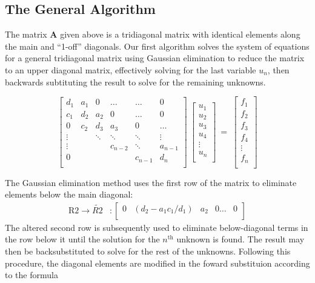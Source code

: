 \documentclass[10pt,showpacs,preprintnumbers,footinbib,amsmath,amssymb,aps,prl,twocolumn,groupedaddress,superscriptaddress,showkeys]{revtex4-1}
\begin{document}
\subsection*{The General Algorithm}

The matrix $\mathbf{A}$ given above is a tridiagonal matrix with identical elements along
the main and ``1-off'' diagonals. Our first algorithm solves the system of equations for a general
tridiagonal matrix using Gaussian elimination to reduce the matrix to an upper diagonal matrix,
effectively solving for the last variable $u_n$, then backwards subtituting the result to solve
for the remaining unknowns.

\[
\begin{bmatrix}
	d_1 & a_1 & 0 & \dots & \dots & 0 \\
	c_1 & d_2 & a_2 & 0 & \dots & 0 \\
	0 & c_2 & d_3 & a_3 & 0 & \dots \\
	\vdots & & \ddots & \ddots & \ddots & \vdots \\
	\vdots & & & c_{n-2} & \ddots & a_{n-1}\\
	0 & & & & c_{n-1} & d_n \\
\end{bmatrix}
~
\begin{bmatrix}
	u_1\\
	u_2\\
	u_3\\
	u_4\\
	\vdots\\
	u_n\\
\end{bmatrix}
~
=
~
\begin{bmatrix}
	f_1\\
	f_2\\
	f_3\\
	f_4\\
	\vdots\\
	f_n\\
\end{bmatrix}
\]

The Gaussian elimination method uses the first row of the matrix to
eliminate elements below the main diagonal:
\begin{align*}
	\mathrm{R2} \rightarrow \tilde{R2}&:
	\begin{bmatrix}
		0 & (d_2 - a_1 c_1/d_1) & a_2 & 0 \dots & 0\\
	\end{bmatrix}
\end{align*}
The altered second row is subsequently used to eliminate below-diagonal terms in the row
below it until the solution for the $n^{\mathrm{th}}$ unknown is found. The
result may then be backsubstituted to solve for the rest of the unknowns.
Following this procedure, the diagonal elements are modified in the foward
substituion according to the formula
\end{document}
